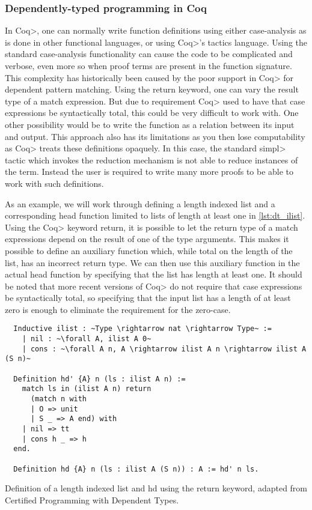 \subsubsection{Dependently-typed programming in Coq}
In \<Coq>, one can normally write function definitions using either case-analysis as is done in other functional languages, or using \<Coq>'s tactics language.
Using the standard case-analysis functionality can cause the code to be complicated and verbose, even more so when proof terms are present in the function signature.
This complexity has historically been caused by the poor support in \<Coq> for dependent pattern matching.
Using the return keyword, one can vary the result type of a match expression. But due to requirement \<Coq> used to have that case expressions be syntactically total, this could be very difficult to work with.
One other possibility would be to write the function as a relation between its input and output.
This approach also has its limitations as you then lose computability as \<Coq> treats these definitions opaquely.
In this case, the standard \<simpl> tactic which invokes the reduction mechanism is not able to reduce instances of the term.
Instead the user is required to write many more proofs to be able to work with such definitions.

As an example, we will work through defining a length indexed list and a corresponding head function limited to lists of length at least one in \cref{lst:dt_ilist}.
Using the \<Coq> keyword return, it is possible to let the return type of a match expressions depend on the result of one of the type arguments.
This makes it possible to define an auxiliary function which, while total on the length of the list, has an incorrect return type.
We can then use this auxiliary function in the actual head function by specifying that the list has length at least one.
It should be noted that more recent versions of \<Coq> do not require that case expressions be syntactically total, so specifying that the input list has a length of at least zero is enough to eliminate the requirement for the zero-case.

\begin{listing}
  \begin{verbatim}
  Inductive ilist : ~Type \rightarrow nat \rightarrow Type~ :=
    | nil : ~\forall A, ilist A 0~
    | cons : ~\forall A n, A \rightarrow ilist A n \rightarrow ilist A (S n)~

  Definition hd' {A} n (ls : ilist A n) :=
    match ls in (ilist A n) return
      (match n with
      | O => unit
      | S _ => A end) with
    | nil => tt
    | cons h _ => h
  end.

  Definition hd {A} n (ls : ilist A (S n)) : A := hd' n ls.
  \end{verbatim}
  \caption{Definition of a length indexed list and hd using the return keyword, adapted from Certified Programming with Dependent Types\cite{ChlipalaCPDT}.}
  \label{lst:dt_ilist}
\end{listing}

